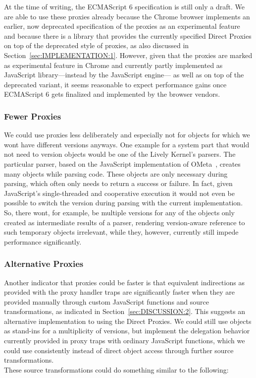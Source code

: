 At the time of writing, the ECMAScript 6 specification is still only a draft.
We are able to use these proxies already because the Chrome browser implements an earlier, now deprecated specification of the proxies as an experimental feature and because there is a library that provides the currently specified Direct Proxies on top of the deprecated style of proxies, as also discussed in Section~\ref{sec:IMPLEMENTATION:1}.
However, given that the proxies are marked as experimental feature in Chrome and currently partly implemented as JavaScript library---instead by the JavaScript engine--- as well as on top of the deprecated variant, it seems reasonable to expect performance gains once ECMAScript 6 gets finalized and implemented by the browser vendors.

\subsubsection{Fewer Proxies}
We could use proxies less deliberately and especially not for objects for which we wont have different versions anyways.
One example for a system part that would not need to version objects would be one of the Lively Kernel's parsers.
The particular parser, based on the JavaScript implementation of OMeta~\cite{Warth2007OOL}, creates many objects while parsing code.
These objects are only necessary during parsing, which often only needs to return a success or failure.
In fact, given JavaScript's single-threaded and cooperative execution it would not even be possible to switch the version during parsing with the current implementation.
So, there wont, for example, be multiple versions for any of the objects only created as intermediate results of a parser, rendering version-aware reference to such temporary objects irrelevant, while they, however, currently still impede performance significantly.

\subsubsection{Alternative Proxies}
Another indicator that proxies could be faster is that equivalent indirections as provided with the proxy handler traps are significantly faster when they are provided manually through custom JavaScript functions and source transformations, as indicated in Section~\ref{sec:DISCUSSION:2}.
This suggests an alternative implementation to using the Direct Proxies.
We could still use objects as stand-ins for a multiplicity of versions, but implement the delegation behavior currently provided in proxy traps with ordinary JavaScript functions, which we could use consistently instead of direct object access through further source transformations.\\
These source transformations could do something similar to the following:

